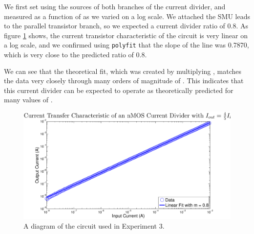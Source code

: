 We first set \Iin using the sources of both branches of the current divider, and measured \Iout as a function of \Iin as we varied \Iin on a log scale. We attached the SMU leads to the parallel transistor branch, so we expected a current divider ratio of 0.8. As figure \ref{fig:exp3p1} shows, the current transistor characteristic of the circuit is very linear on a log scale, and we confirmed using \texttt{polyfit} that the slope of the line was 0.7870, which is very close to the predicted ratio of 0.8.

We can see that the theoretical fit, which was created by multiplying , matches the data very closely through many orders of magnitude of \Iin. This indicates that this current divider can be expected to operate as theoretically predicted for many values of \Iin.

\begin{figure}[H]
\centering
\includegraphics[width=\linewidth]{../Figures/Experiment3Figure1.eps}
\caption{A diagram of the circuit used in Experiment 3.}
\label{fig:exp3p1}
\end{figure}
